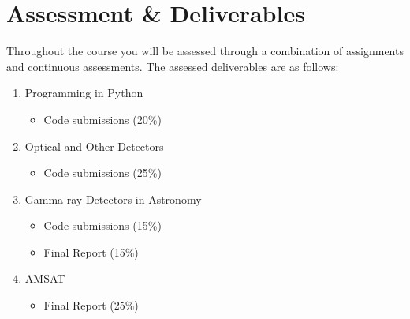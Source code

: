 \documentclass{tufte-book}
\begin{document}



\newpage

\section{Assessment \& Deliverables}

{Throughout} the course you will be assessed through a combination of assignments and continuous assessments. The assessed deliverables are as follows: 

\begin{enumerate}
    \item Programming in Python
    \begin{itemize}
        \item Code submissions (20\%)
    \end{itemize}
    \item Optical and Other Detectors
    \begin{itemize}
        \item Code submissions (25\%)
    \end{itemize}
    \item Gamma-ray Detectors in Astronomy
    \begin{itemize}
        \item Code submissions (15\%)
        \item Final Report (15\%)
    \end{itemize}
    \item AMSAT
    \begin{itemize}
        \item Final Report  (25\%)
    \end{itemize}
\end{enumerate}
\end{document}
